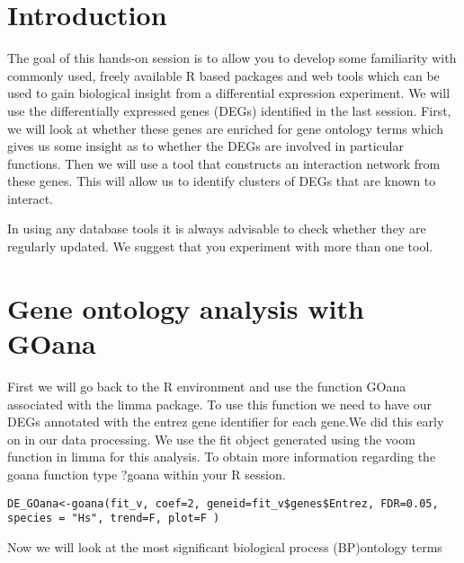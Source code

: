 \newpage

\section{Introduction}


The goal of this hands-on session is to allow you to develop some familiarity with commonly used, freely available R based packages and web tools which can be used to gain biological insight from a differential expression experiment. 
We will use the differentially expressed genes (DEGs) identified in the last session.  
First, we will look at whether these genes are enriched for gene ontology terms which gives us some insight as to whether the DEGs are involved in particular functions. Then we will use a tool that constructs an interaction network from these genes. This will allow us to identify clusters of DEGs that are known to interact.  

\begin{note}In using any database tools it is always advisable to check whether they are regularly updated. We suggest that you experiment with more than one tool.
\end{note}

\section{Gene ontology analysis with GOana}
First we will go back to the R environment and use the function GOana associated with the limma package.  To use this function we need to have our DEGs annotated with the entrez gene identifier for each gene.We did this early on in our data processing. We use the fit object generated using the voom function in limma for this analysis. To obtain more information regarding the goana function type ?goana within your R session.

\begin{steps}
\begin{lstlisting}
DE_GOana<-goana(fit_v, coef=2, geneid=fit_v$genes$Entrez, FDR=0.05, species = "Hs", trend=F, plot=F )
\end{lstlisting}
\end{steps}


Now we will look at the most significant biological process (BP)ontology terms 

